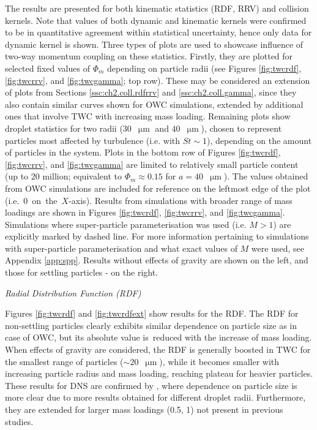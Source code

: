 \documentclass{pracamgren}
\begin{document}
The results are presented for both kinematic statistics (RDF, RRV) and collision kernels.
Note that values of both dynamic and kinematic kernels were confirmed to be in quantitative agreement within statistical uncertainty, hence only data for dynamic kernel is shown.
Three types of plots are used to showcase influence of two-way momentum coupling on these statistics.
Firstly, they are plotted for selected fixed values of $\Phi_m$ depending on particle radii (see Figures \ref{fig:twcrdf}, \ref{fig:twcrrv}, and \ref{fig:twcgamma}; top row).
These may be considered an extension of plots from Sections \ref{ssc:ch2.coll.rdfrrv} and \ref{ssc:ch2.coll.gamma}, since they also contain similar curves shown for OWC simulations, extended by additional ones that involve TWC with increasing mass loading.
Remaining plots show droplet statistics for two radii ($30$~$\upmu\text{m}$ and $40$~$\upmu\text{m}$), chosen to represent particles most affected by turbulence (i.e. with $St \sim 1$), depending on the amount of particles in the system.
Plots in the bottom row of Figures \ref{fig:twcrdf}, \ref{fig:twcrrv}, and \ref{fig:twcgamma} are limited to relatively small particle content (up to 20 million; equivalent to $\Phi_m \approx 0.15$ for $a = 40$~$\upmu\text{m}$).
The values obtained from OWC simulations are included for reference on the leftmost edge of the plot (i.e.~$0$~on~the~$X$-axis). 
Results from simulations with broader range of mass loadings are shown in Figures \ref{fig:twcrdf}, \ref{fig:twcrrv}, and \ref{fig:twcgamma}.
Simulations where super-particle parameterisation was used (i.e. $M>1$) are explicitly marked by dashed line.
For more information pertaining to simulations with super-particle parameterisation and what exact values of $M$ were used, see Appendix \ref{app:spp}.
Results without effects of gravity are shown on the left, and those for settling particles - on the right. 

\medskip

\emph{Radial Distribution Function (RDF)}

Figures \ref{fig:twcrdf} and \ref{fig:twcrdfext} show results for the RDF.
The RDF for non-settling particles clearly exhibits similar dependence on particle size as in case of OWC, but its absolute value is~reduced with the increase of mass loading.
When effects of gravity are considered, the RDF is generally boosted in TWC for the smallest range of particles ($\sim 20$~$\upmu\text{m}$), while it becomes smaller with increasing particle radius and mass loading, reaching plateau for heavier particles.
These results for DNS are confirmed by \textcite[Fig. 19]{Rosa2020}, where dependence on particle size is more clear due to more results obtained for different droplet radii.
Furthermore, they are extended for larger mass loadings (0.5, 1) not present in previous studies.
\end{document}
